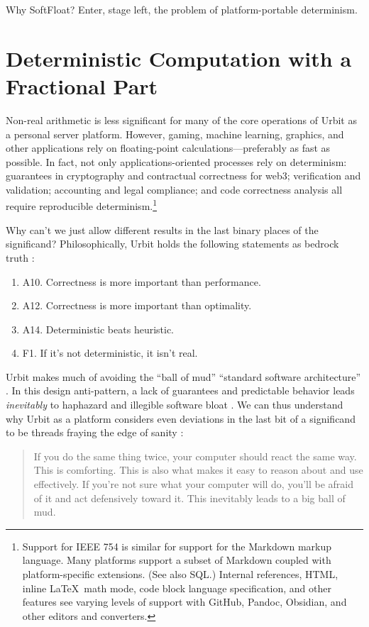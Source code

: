 \documentclass[twoside]{article}
\begin{document}
Why SoftFloat?  Enter, stage left, the problem of platform-portable determinism.


\section{Deterministic Computation with a Fractional Part}

Non-real arithmetic is less significant for many of the core operations of Urbit as a personal server platform.  However, gaming, machine learning, graphics, and other applications rely on floating-point calculations—preferably as fast as possible.  In fact, not only applications-oriented processes rely on determinism:  guarantees in cryptography and contractual correctness for web3; verification and validation; accounting and legal compliance; and code correctness analysis all require reproducible determinism.\footnote{Support for IEEE 754 is similar for support for the Markdown markup language.  Many platforms support a subset of Markdown coupled with platform-specific extensions.  (See also SQL.)  Internal references, HTML, inline \LaTeX~math mode, code block language specification, and other features see varying levels of support with GitHub, Pandoc, Obsidian, and other editors and converters.}

Why can't we just allow different results in the last binary places of the significand?  Philosophically, Urbit holds the following statements as bedrock truth \citep{Monk2020}:

\begin{enumerate}
  \item  A10.  Correctness is more important than performance.
  \item  A12.  Correctness is more important than optimality.
  \item  A14.  Deterministic beats heuristic.
  \item  F1.  If it's not deterministic, it isn't real.
\end{enumerate}

Urbit makes much of avoiding the “ball of mud” “standard software architecture” \citep{Foote1999}.  In this design anti-pattern, a lack of guarantees and predictable behavior leads \emph{inevitably} to haphazard and illegible software bloat \citep{Foote1999}.  We can thus understand why Urbit as a platform considers even deviations in the last bit of a significand to be threads fraying the edge of sanity \citet{Monk2020a}:

\begin{quote}
If you do the same thing twice, your computer should react the same way.  This is comforting.  This is also what makes it easy to reason about and use effectively.  If you're not sure what your computer will do, you'll be afraid of it and act defensively toward it.  This inevitably leads to a big ball of mud.
\end{quote}
\end{document}
